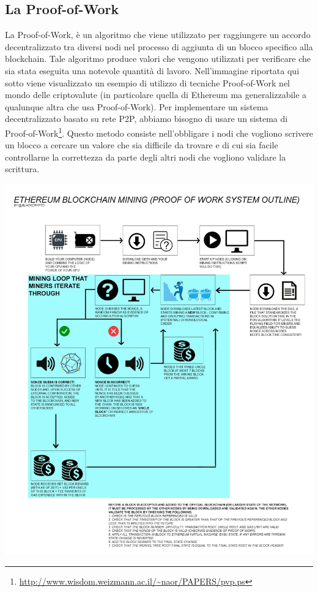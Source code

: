 \subsection{La Proof-of-Work}
La Proof-of-Work, è un algoritmo che viene utilizzato per raggiungere un accordo decentralizzato tra diversi nodi nel processo di aggiunta di un blocco specifico alla blockchain.
Tale algoritmo produce valori che vengono utilizzati per verificare che sia stata eseguita una notevole quantità di lavoro. Nell'immagine riportata qui sotto viene visualizzato un esempio di utilizzo di tecniche Proof-of-Work nel mondo delle criptovalute (in particolare quella di Ethereum ma generalizzabile a qualunque altra che usa Proof-of-Work).
Per implementare un sistema decentralizzato basato su rete P2P, abbiamo bisogno di usare un sistema di Proof-of-Work\footnote{\url{http://www.wisdom.weizmann.ac.il/~naor/PAPERS/pvp.ps}}. Questo metodo consiste nell'obbligare i nodi che vogliono scrivere un blocco a cercare un valore che sia difficile da trovare e di cui sia facile controllarne la correttezza da parte degli altri nodi che vogliono validare la scrittura.
\begin{center}
    \includegraphics[width=\linewidth]{img/pow}
\end{center}

